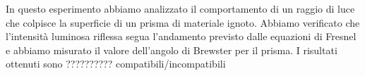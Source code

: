 In questo esperimento abbiamo analizzato il comportamento di un raggio di luce
che colpisce la superficie di un prisma di materiale ignoto.
Abbiamo verificato che l’intensità luminosa riflessa segua l’andamento
previsto dalle equazioni di Fresnel e abbiamo misurato il valore dell'angolo di Brewster
per il prisma.
I risultati ottenuti sono ?????????? compatibili/incompatibili %
\endinput
